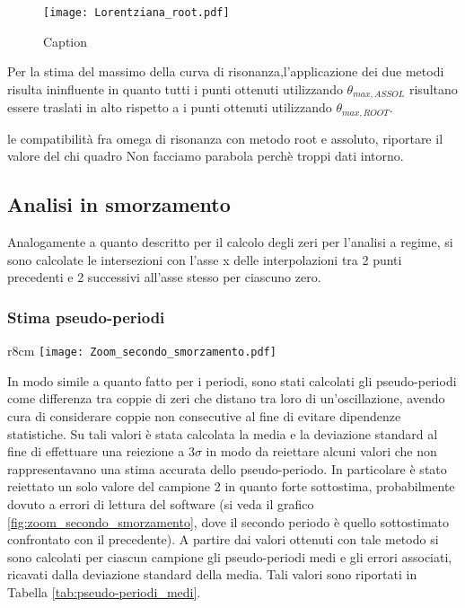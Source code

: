 \documentclass[a4paper,11pt,oneside]{article}
\begin{document}
\begin{figure}[h!]
    \centering
    \texttt{[image: Lorentziana\_root.pdf]}
    \caption{Caption}
    \label{fig:lorentziana_root}
\end{figure}

Per la stima del massimo della curva di risonanza,l'applicazione dei due metodi risulta ininfluente in quanto tutti i punti ottenuti utilizzando  $\theta_ {max,ASSOL}$ risultano essere traslati in alto rispetto a i punti ottenuti utilizzando  $\theta_ {max,ROOT}$.



le compatibilità fra omega di risonanza con metodo root e assoluto, riportare il valore del chi quadro
Non facciamo parabola perchè troppi dati intorno.






\subsection{Analisi in smorzamento}
Analogamente a quanto descritto per il calcolo degli zeri per l'analisi a regime, si sono calcolate le intersezioni con l'asse x delle interpolazioni tra 2 punti precedenti e 2 successivi all'asse stesso per ciascuno zero.

\subsubsection{Stima pseudo-periodi}

\begin{wrapfigure}{r}{8cm}
    \centering
    \texttt{[image: Zoom\_secondo\_smorzamento.pdf]}
    \caption{Confronto pseudo-periodi - $2^o$ campione}
    \label{fig:zoom_secondo_smorzamento}
\end{wrapfigure}

In modo simile a quanto fatto per i periodi, sono stati calcolati gli pseudo-periodi come differenza tra coppie di zeri che distano tra loro di un'oscillazione, avendo cura di considerare coppie non consecutive al fine di evitare dipendenze statistiche. Su tali valori è stata calcolata la media e la deviazione standard al fine di effettuare una reiezione a $3\sigma$ in modo da reiettare alcuni valori che non rappresentavano una stima accurata dello pseudo-periodo. In particolare è stato reiettato un solo valore del campione 2 in quanto forte sottostima, probabilmente dovuto a errori di lettura del software (si veda il grafico \ref{fig:zoom_secondo_smorzamento}, dove il secondo periodo è quello sottostimato confrontato con il precedente).
A partire dai valori ottenuti con tale metodo si sono calcolati per ciascun campione  gli pseudo-periodi medi e gli errori associati, ricavati dalla deviazione standard della media. Tali valori sono riportati in Tabella \ref{tab:pseudo-periodi_medi}.
\end{document}
